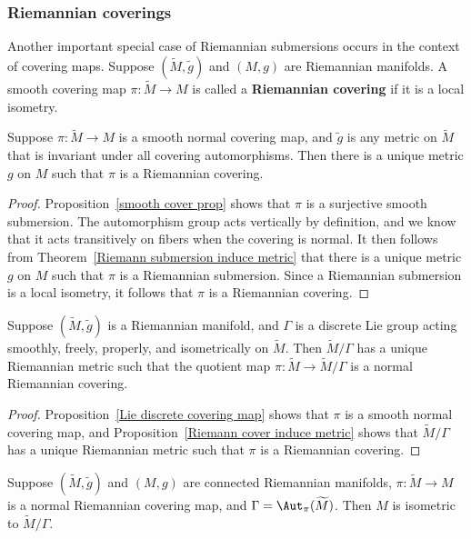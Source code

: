 \subsubsection{Riemannian coverings}
Another important special case of Riemannian submersions occurs in the context of
covering maps. Suppose $(\widetilde{M},\widetilde{g})$ and $(M,g)$ are Riemannian 
manifolds. A smooth covering map $\pi:\widetilde{M}\to M$ is called a \textbf{Riemannian 
covering} if it is a local isometry.
\begin{proposition}\label{Riemann cover induce metric}
Suppose $\pi:\widetilde{M}\to M$ is a smooth normal covering map, and $\widetilde{g}$ 
is any metric on $\widetilde{M}$ that is invariant under all covering automorphisms. 
Then there is a unique metric $g$ on $M$ such that $\pi$ is a Riemannian covering.
\end{proposition}
\begin{proof}
Proposition~\ref{smooth cover prop} shows that $\pi$ is a surjective smooth 
submersion. The automorphism group acts vertically by definition, and we know 
that it acts transitively on fibers when the covering is normal. It then follows 
from Theorem~\ref{Riemann submersion induce metric} that there is a unique metric 
$g$ on $M$ such that $\pi$ is a Riemannian submersion. Since a Riemannian 
submersion is a local isometry, it follows that $\pi$ is a Riemannian covering.
\end{proof}
\begin{proposition}\label{Riemann discrete action induce metric}
Suppose $(\widetilde{M},\widetilde{g})$ is a Riemannian manifold, and $\Gamma$ is a 
discrete Lie group acting smoothly, freely, properly, and isometrically on $\widetilde{M}$. 
Then $\widetilde{M}/\Gamma$ has a unique Riemannian metric such that the quotient 
map $\pi:\widetilde{M}\to\widetilde{M}/\Gamma$ is a normal Riemannian covering.
\end{proposition}
\begin{proof}
Proposition~\ref{Lie discrete covering map} shows that $\pi$ is a smooth normal 
covering map, and Proposition~\ref{Riemann cover induce metric} shows that 
$\widetilde{M}/\Gamma$ has a unique Riemannian metric such that $\pi$ is a 
Riemannian covering.
\end{proof}
\begin{corollary}
Suppose $(\widetilde{M},\widetilde{g})$ and $(M,g)$ are connected Riemannian 
manifolds, $\pi:\widetilde{M}\to M$ is a normal Riemannian covering map, and $\Gamma=\Aut_{\pi}(\widetilde{M})$. 
Then $M$ is isometric to $\widetilde{M}/\Gamma$.
\end{corollary}

